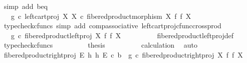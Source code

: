 \begin{isabellebody}
\ {\isacharparenleft}{\kern0pt}simp\ add{\isacharcolon}{\kern0pt}\ b{\isacharunderscore}{\kern0pt}eq{\isacharparenright}{\kern0pt}\isanewline
\ \ \ \ \ \ \isamarkupfalse%
\ \isamarkupfalse%
\ {\isachardoublequoteopen}{\isachardot}{\kern0pt}{\isachardot}{\kern0pt}{\isachardot}{\kern0pt}\ {\isacharequal}{\kern0pt}\ g\ {\isasymcirc}\isactrlsub c\ left{\isacharunderscore}{\kern0pt}cart{\isacharunderscore}{\kern0pt}proj\ X\ X\ {\isasymcirc}\isactrlsub c\ fibered{\isacharunderscore}{\kern0pt}product{\isacharunderscore}{\kern0pt}morphism\ X\ f\ f\ X{\isachardoublequoteclose}\isanewline
\ \ \ \ \ \ \ \ \isamarkupfalse%
\ {\isacharparenleft}{\kern0pt}typecheck{\isacharunderscore}{\kern0pt}cfuncs{\isacharcomma}{\kern0pt}\ simp\ add{\isacharcolon}{\kern0pt}\ comp{\isacharunderscore}{\kern0pt}associative{}\ left{\isacharunderscore}{\kern0pt}cart{\isacharunderscore}{\kern0pt}proj{\isacharunderscore}{\kern0pt}cfunc{\isacharunderscore}{\kern0pt}cross{\isacharunderscore}{\kern0pt}prod{\isacharparenright}{\kern0pt}\isanewline
\ \ \ \ \ \ \isamarkupfalse%
\ \isamarkupfalse%
\ {\isachardoublequoteopen}{\isachardot}{\kern0pt}{\isachardot}{\kern0pt}{\isachardot}{\kern0pt}\ {\isacharequal}{\kern0pt}\ g\ {\isasymcirc}\isactrlsub c\ fibered{\isacharunderscore}{\kern0pt}product{\isacharunderscore}{\kern0pt}left{\isacharunderscore}{\kern0pt}proj\ X\ f\ f\ X{\isachardoublequoteclose}\isanewline
\ \ \ \ \ \ \ \ \isamarkupfalse%
\ fibered{\isacharunderscore}{\kern0pt}product{\isacharunderscore}{\kern0pt}left{\isacharunderscore}{\kern0pt}proj{\isacharunderscore}{\kern0pt}def\ \isamarkupfalse%
\ {\isacharparenleft}{\kern0pt}typecheck{\isacharunderscore}{\kern0pt}cfuncs{\isacharparenright}{\kern0pt}\isanewline
\ \ \ \ \ \ \isamarkupfalse%
\ \isamarkupfalse%
\ {\isacharquery}{\kern0pt}thesis\isanewline
\ \ \ \ \ \ \ \ \isamarkupfalse%
\ calculation\ \isamarkupfalse%
\ auto\isanewline
\ \ \ \ \isamarkupfalse%
\isanewline
\ \ \ \ \isamarkupfalse%
\ {\isachardoublequoteopen}fibered{\isacharunderscore}{\kern0pt}product{\isacharunderscore}{\kern0pt}right{\isacharunderscore}{\kern0pt}proj\ E\ h\ h\ E\ {\isasymcirc}\isactrlsub c\ b\ {\isacharequal}{\kern0pt}\ g\ {\isasymcirc}\isactrlsub c\ fibered{\isacharunderscore}{\kern0pt}product{\isacharunderscore}{\kern0pt}right{\isacharunderscore}{\kern0pt}proj\ X\ f\ f\ X{\isachardoublequoteclose}\isanewline
\ \ \ \ \isamarkupfalse%

\end{isabellebody}
